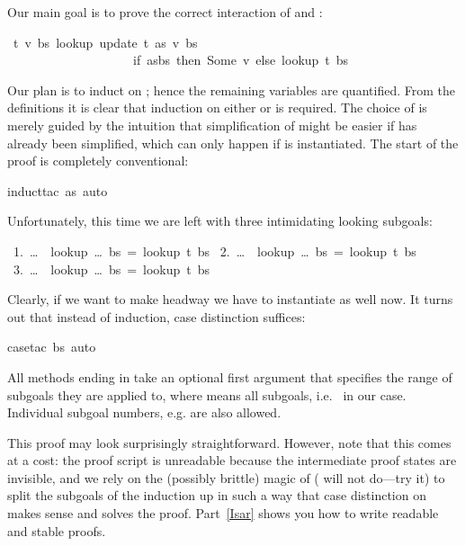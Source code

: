 \begin{isabellebody}
\begin{isamarkuptext}
Our main goal is to prove the correct interaction of  and
:%
\end{isamarkuptext}%
\ {\isachardoublequote}{\isasymforall}t\ v\ bs{\isachardot}\ lookup\ {\isacharparenleft}update\ t\ as\ v{\isacharparenright}\ bs\ {\isacharequal}\isanewline
\ \ \ \ \ \ \ \ \ \ \ \ \ \ \ \ \ \ \ \ {\isacharparenleft}if\ as{\isacharequal}bs\ then\ Some\ v\ else\ lookup\ t\ bs{\isacharparenright}{\isachardoublequote}%
\begin{isamarkuptxt}%
\noindent
Our plan is to induct on ; hence the remaining variables are
quantified. From the definitions it is clear that induction on either
 or  is required. The choice of  is merely
guided by the intuition that simplification of  might be easier
if  has already been simplified, which can only happen if
 is instantiated.
The start of the proof is completely conventional:%
\end{isamarkuptxt}%
induct{\isacharunderscore}tac\ as{\isacharcomma}\ auto{\isacharparenright}%
\begin{isamarkuptxt}%
\noindent
Unfortunately, this time we are left with three intimidating looking subgoals:
\begin{isabelle}
~1.~\dots~{\isasymLongrightarrow}~lookup~\dots~bs~=~lookup~t~bs\isanewline
~2.~\dots~{\isasymLongrightarrow}~lookup~\dots~bs~=~lookup~t~bs\isanewline
~3.~\dots~{\isasymLongrightarrow}~lookup~\dots~bs~=~lookup~t~bs
\end{isabelle}
Clearly, if we want to make headway we have to instantiate  as
well now. It turns out that instead of induction, case distinction
suffices:%
\end{isamarkuptxt}%
case{\isacharunderscore}tac{\isacharbrackleft}{\isacharbang}{\isacharbrackright}\ bs{\isacharcomma}\ auto{\isacharparenright}\isanewline
{}%
\begin{isamarkuptext}%
\noindent
All methods ending in  take an optional first argument that
specifies the range of subgoals they are applied to, where \isa{{\isacharbrackleft}{\isacharbang}{\isacharbrackright}} means
all subgoals, i.e.\  in our case. Individual subgoal numbers,
e.g.  are also allowed.

This proof may look surprisingly straightforward. However, note that this
comes at a cost: the proof script is unreadable because the intermediate
proof states are invisible, and we rely on the (possibly brittle) magic of
 ( will not do---try it) to split the subgoals
of the induction up in such a way that case distinction on  makes
sense and solves the proof. Part~\ref{Isar} shows you how to write readable
and stable proofs.%
\end{isamarkuptext}%
\end{isabellebody}%
